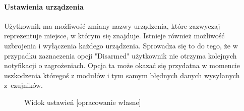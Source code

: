 \documentclass[polish,bachelor,a4paper,oneside]{ppfcmthesis}
\begin{document}
    \paragraph{Ustawienia urządzenia}
    Użytkownik ma możliwość zmiany nazwy urządzenia, które zazwyczaj reprezentuje miejsce, w którym się znajduje. Istnieje również możliwość uzbrojenia i wyłączenia każdego urządzenia. Sprowadza się to do tego, że w przypadku zaznaczenia opcji "Disarmed"  użytkownik nie otrzyma kolejnych notyfikacji o zagrożeniach. Opcja ta może okazać się przydatna w momencie uszkodzenia któregoś z modułów i tym samym błędnych danych wysyłanych z~czujników.
    \nopagebreak
    \begin{figure}[H]
        \centering
        \hfill
        \hfill
        \caption{Widok ustawień [opracowanie własne] }
        \label{fig:ustawienia}
    \end{figure}
\end{document}
